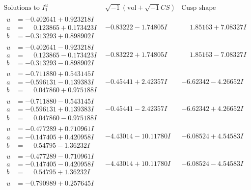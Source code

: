 \documentclass[1p]{elsarticle_modified}
\theoremstyle{definition}
\newcommand{\I}{\sqrt{-1}}
\begin{document}
$$\begin{array}{c|c|c}  
\text{Solutions to }I^u_{1}& \I (\text{vol} + \sqrt{-1}CS) & \text{Cusp shape}\\
 \hline 
\begin{aligned}
u &= -0.402641 + 0.923218 I \\
a &= \phantom{-}0.123865 + 0.173423 I \\
b &= -0.313293 + 0.898902 I\end{aligned}
 & -0.83222 - 1.74805 I & \phantom{-}1.85163 + 7.08327 I \\ \hline\begin{aligned}
u &= -0.402641 - 0.923218 I \\
a &= \phantom{-}0.123865 - 0.173423 I \\
b &= -0.313293 - 0.898902 I\end{aligned}
 & -0.83222 + 1.74805 I & \phantom{-}1.85163 - 7.08327 I \\ \hline\begin{aligned}
u &= -0.711880 + 0.543145 I \\
a &= -0.596131 - 0.139383 I \\
b &= \phantom{-}0.047860 + 0.975188 I\end{aligned}
 & -0.45441 + 2.42357 I & -6.62342 - 4.26652 I \\ \hline\begin{aligned}
u &= -0.711880 - 0.543145 I \\
a &= -0.596131 + 0.139383 I \\
b &= \phantom{-}0.047860 - 0.975188 I\end{aligned}
 & -0.45441 - 2.42357 I & -6.62342 + 4.26652 I \\ \hline\begin{aligned}
u &= -0.477289 + 0.710961 I \\
a &= -0.147405 + 0.420958 I \\
b &= \phantom{-}0.54795 - 1.36232 I\end{aligned}
 & -4.43014 - 10.11780 I & -6.08524 + 4.54583 I \\ \hline\begin{aligned}
u &= -0.477289 - 0.710961 I \\
a &= -0.147405 - 0.420958 I \\
b &= \phantom{-}0.54795 + 1.36232 I\end{aligned}
 & -4.43014 + 10.11780 I & -6.08524 - 4.54583 I \\ \hline\begin{aligned}
u &= -0.790989 + 0.257645 I \\

\end{aligned}
\end{array}$$
\end{document}
